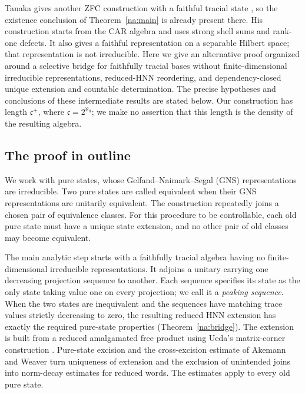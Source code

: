 Tanaka gives another ZFC construction with a faithful tracial state
\cite[Theorems~1.1, 4.1 and~5.3]{Tanaka2026}, so the existence conclusion
of Theorem~\ref{na:main} is already present there. His construction
starts from the CAR algebra and uses strong shell sums and rank-one
defects. It also gives a faithful representation on a separable Hilbert
space; that representation is not irreducible. Here we give an
alternative proof organized around a selective bridge for faithfully
tracial bases without finite-dimensional irreducible representations,
reduced-HNN reordering, and dependency-closed
unique extension and countable determination. The precise hypotheses
and conclusions of these intermediate results are stated below.
Our construction has length $\mathfrak c^+$, where
$\mathfrak c=2^{\aleph_0}$; we make no assertion that this length is the
density of the resulting algebra.

\subsection*{The proof in outline}
We work with pure states, whose Gelfand--Naimark--Segal (GNS)
representations are irreducible.
Two pure states are called equivalent when their GNS representations
are unitarily equivalent. The construction repeatedly joins a chosen
pair of equivalence classes. For this procedure to be controllable,
each old pure state must have a unique state extension, and no other
pair of old classes may become equivalent.

The main analytic step starts with a faithfully tracial algebra having
no finite-dimensional irreducible representations. It adjoins a unitary
carrying one decreasing projection sequence to another. Each sequence specifies its state as
the only state taking value one on every projection; we call it a
\emph{peaking sequence}. When the two states are inequivalent and the
sequences have matching trace
values strictly decreasing to zero, the resulting reduced HNN extension
has exactly the required pure-state properties
(Theorem~\ref{na:bridge}). The extension is built from a reduced
amalgamated free product using Ueda's matrix-corner construction
\cite{UedaPreprint2008,Ueda2008}. Pure-state excision
\cite{AkemannAndersonPedersen1986} and the cross-excision estimate of
Akemann and Weaver \cite[Lemma~1]{AkemannWeaver2004} turn uniqueness
of extension and the exclusion of unintended joins into norm-decay
estimates for reduced words. The estimates apply to every old pure state.

